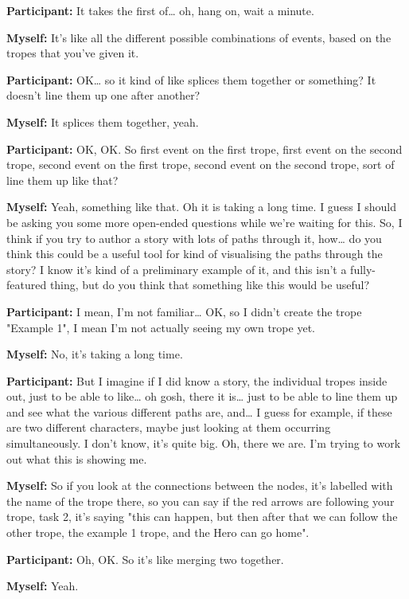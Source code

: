 \documentclass[11pt]{report}
\newcommand{\llabel}[1]{\hypertarget{llineno:#1}{\linelabel{#1}}}
\begin{document}
\begin{linenumbers}
\textbf{Participant:} It takes the first of\ldots{} oh, hang on, wait a minute.

\textbf{Myself:} It's like all the different possible combinations of events, based on the tropes that you've given it.

\textbf{Participant:} OK\ldots{} so it kind of like splices them together or something? It doesn't line them up one after another?

\textbf{Myself:} It splices them together, yeah.

\textbf{Participant:} OK, OK. So first event on the first trope, first event on the second trope, second event on the first trope, second event on the second trope, sort of line them up like that?

\textbf{Myself:} Yeah, something like that. Oh it is taking a long time. I guess I should be asking you some more open-ended questions while we're waiting for this. So, I think if you try to author a story with lots of paths through it, how\ldots{} do you think this could be a useful tool for kind of visualising the paths through the story? I know it's kind of a preliminary example of it, and this isn't a fully-featured thing, but do you think that something like this would be useful?

\textbf{Participant:} I mean, I'm not familiar\ldots{} OK, so I didn't create the trope "Example 1", I mean I'm not actually seeing my own trope yet.

\textbf{Myself:} No, it's taking a long time.

\textbf{Participant:} But I imagine if I did know a story, the individual tropes inside out, just to be able to like\ldots{} oh gosh, there it is\ldots{} just to be able to line them up and see what the various different paths are, and\ldots{} I guess for example, if these are two different characters, maybe just looking at them occurring simultaneously. I don't know, it's quite big. Oh, there we are. I'm trying to work out what this is showing me.\llabel{lne:use2e2}

\textbf{Myself:} So if you look at the connections between the nodes, it's labelled with the name of the trope there, so you can say if the red arrows are following your trope, task 2, it's saying "this can happen, but then after that we can follow the other trope, the example 1 trope, and the Hero can go home".

\textbf{Participant:} Oh, OK. So it's like merging two together.

\textbf{Myself:} Yeah.


\end{linenumbers}
\end{document}
